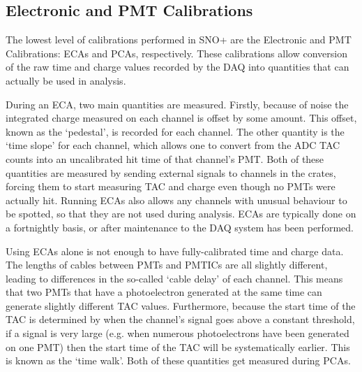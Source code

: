 \subsection{Electronic and PMT Calibrations}
The lowest level of calibrations performed in SNO+ are the Electronic and PMT Calibrations: ECAs and PCAs, respectively. These calibrations allow conversion of the raw time and charge values recorded by the DAQ into quantities that can actually be used in analysis.

During an ECA, two main quantities are measured. Firstly, because of noise the integrated charge measured on each channel is offset by some amount. This offset, known as the `pedestal', is recorded for each channel. The other quantity is the `time slope' for each channel, which allows one to convert from the ADC TAC counts into an uncalibrated hit time of that channel's PMT. Both of these quantities are measured by sending external signals to channels in the crates, forcing them to start measuring TAC and charge even though no PMTs were actually hit. Running ECAs also allows any channels with unusual behaviour to be spotted, so that they are not used during analysis. ECAs are typically done on a fortnightly basis, or after maintenance to the DAQ system has been performed.

Using ECAs alone is not enough to have fully-calibrated time and charge data. The lengths of cables between PMTs and PMTICs are all slightly different, leading to differences in the so-called `cable delay' of each channel. This means that two PMTs that have a photoelectron generated at the same time can generate slightly different TAC values. Furthermore, because the start time of the TAC is determined by when the channel's signal goes above a constant threshold, if a signal is very large (e.g. when numerous photoelectrons have been generated on one PMT) then the start time of the TAC will be systematically earlier. This is known as the `time walk'. Both of these quantities get measured during PCAs.

